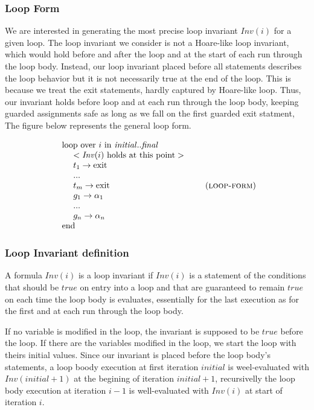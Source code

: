 \documentclass[a4paper,10pt]{article}
\newcommand{\idx}{\ensuremath{i}\xspace}
\newcommand{\idxinitial}{\ensuremath{\mathit{initial}}\xspace}
\newcommand{\idxfinal}{\ensuremath{\mathit{final}}\xspace}
\newcommand{\KWloop}{\ensuremath{\mathrm{loop}~}}
\newcommand{\KWend}{\ensuremath{\mathrm{end}~}}
\newcommand{\KWover}{\ensuremath{\mathrm{over}~}}
\newcommand{\KWin}{\ensuremath{~\mathrm{in}~}}
\newcommand{\KWexit}{\ensuremath{\mathrm{exit}}}
\newcommand{\Inv}[1]{\ensuremath{\mathit{Inv}(#1)\xspace}}
\newcommand{\loopform}{\textsc{loop-form}\xspace}
\begin{document}
\subsubsection*{Loop Form}
We are interested in generating the most precise loop invariant \Inv{\idx} for
a given loop. The loop invariant we consider is not a Hoare-like loop
invariant, which would hold before and after the loop and at the start of each
run through the loop body. Instead, our loop invariant placed before all statements
describes the loop behavior but it is not necessarily true at the end of the loop.
This is because we treat the exit statements, hardly captured by Hoare-like loop. 
Thus, our invariant holds before loop and at each run through the loop body, 
keeping guarded assignments safe as long as we fall on the first guarded exit statment,
The figure below represents the general loop form.

\begin{align*}
\begin{array}{l}
  \KWloop \KWover i \KWin \idxinitial ..\idxfinal \\
  ~~~~ < \textrm{\Inv{\idx} holds at this point} >\\
  ~~~~ t_1 \rightarrow \KWexit \\
  ~~~~ ... \\
  ~~~~ t_m \rightarrow \KWexit \\
  ~~~~ g_1 \rightarrow \alpha_1 \\
  ~~~~ ... \\
  ~~~~ g_n \rightarrow \alpha_n \\
  \KWend
\end{array}
 \tag{\loopform}\\
\end{align*}

\subsubsection*{Loop Invariant definition}
A formula \Inv{\idx} is a loop invariant if \Inv{\idx} is a statement of the conditions that 
should be $\mathit{true}$ on entry into a loop and that are guaranteed to remain $\mathit{true}$
on each time the loop body is evaluates, essentially for the last execution as for the first 
and at each run through the loop body. 

If no variable is modified in the loop, the invariant is supposed to be $\mathit{true}$ before 
the loop. If there are the variables modified in the loop, we start the loop with theirs initial
values. 
Since our invariant is placed before the loop body's statements, a loop boody execution at first 
iteration $\idxinitial$ is weel-evaluated with $\Inv{\idxinitial+1}$ at the begining of iteration 
$\idxinitial +1$, recursivelly the loop body execution at iteration $\idx-1$ is well-evaluated with 
$\Inv{\idx}$ at start of iteration $\idx$. 
\end{document}
